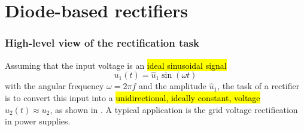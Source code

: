 \section{Diode-based rectifiers}

\begin{frame}
	\frametitle{High-level view of the rectification task}
	Assuming that the input voltage is an \hl{ideal sinusoidal signal} $$u_1(t) = \hat{u}_1 \sin(\omega t)$$ with the angular frequency $\omega = 2\pi f$ and the amplitude $\hat{u}_1$, the task of a rectifier is to convert this input into a \hl{unidirectional, ideally constant, voltage} $u_2(t)\approx u_2$, as shown in  . A typical application is the grid voltage rectification in power supplies.


\end{frame}
